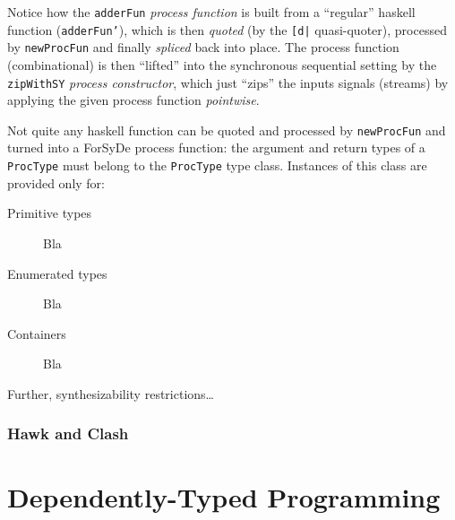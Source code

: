 
            Notice how the \texttt{adderFun} \emph{process function} is built from a ``regular'' haskell function
            (\texttt{adderFun'}), which is then \emph{quoted} (by the \texttt{[d|} quasi-quoter), processed by
            \texttt{newProcFun} and finally \emph{spliced} back into place.
            The process function (combinational) is then ``lifted'' into the synchronous sequential setting
            by the \texttt{zipWithSY} \emph{process constructor}, which just ``zips'' the inputs signals (streams)
            by applying the given process function \emph{pointwise}.

            Not quite any haskell function can be quoted and processed by \texttt{newProcFun}
            and turned into a ForSyDe process function: the argument and return types of a \texttt{ProcType}
            must belong to the \texttt{ProcType} type class. Instances of this class are provided only for:

            \begin{description}
                \item[Primitive types] Bla
                \item[Enumerated types] Bla
                \item[Containers] Bla
            \end{description}

            Further, synthesizability restrictions\ldots
            

            \subsubsection{Hawk and Clash}




    \section{Dependently-Typed Programming}
    \label{sec:dtp}

